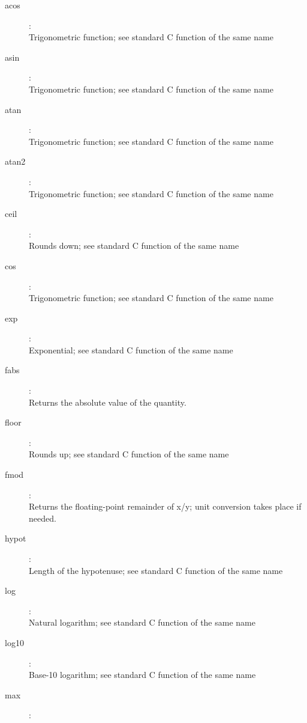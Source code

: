 \begin{description}
\item[acos]:  \\
    Trigonometric function; see standard C function of the same name
\item[asin]:  \\
    Trigonometric function; see standard C function of the same name
\item[atan]:  \\
    Trigonometric function; see standard C function of the same name
\item[atan2]:  \\
    Trigonometric function; see standard C function of the same name
\item[ceil]:  \\
    Rounds down; see standard C function of the same name
\item[cos]:  \\
    Trigonometric function; see standard C function of the same name
\item[exp]:  \\
    Exponential; see standard C function of the same name
\item[fabs]:  \\
    Returns the absolute value of the quantity.
\item[floor]:  \\
    Rounds up; see standard C function of the same name
\item[fmod]:  \\
    Returns the floating-point remainder of x/y; unit conversion takes place if needed.
\item[hypot]:  \\
    Length of the hypotenuse; see standard C function of the same name
\item[log]:  \\
    Natural logarithm; see standard C function of the same name
\item[log10]:  \\
    Base-10 logarithm; see standard C function of the same name
\item[max]:  \\

\end{description}
